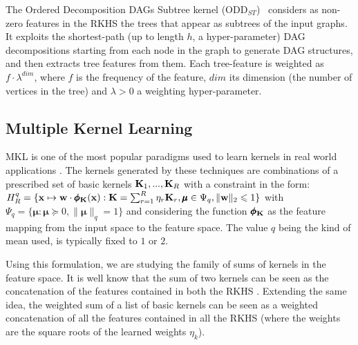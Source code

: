 \documentclass{esannV2}
\newcommand{\xx}{{\bf x}}
\newcommand{\KK}{{\bf K}}
\newcommand{\1}{{\bf 1}}
\newcommand{\mmu}{\pmb{\mu}}
\newcommand{\pphi}{\pmb{\phi}}
\begin{document}
The Ordered Decomposition DAGs Subtree kernel (ODD$_{ST}$)~\cite{DaSanMartino2016} considers as non-zero features in the RKHS the trees that appear as subtrees of the input graphs.
It exploits the shortest-path (up to length $h$, a hyper-parameter) DAG decompositions starting from each node in the graph to generate DAG structures, and then extracts tree features from them.
Each tree-feature is weighted as $f \cdot \lambda^{dim}$, where $f$ is the frequency of the feature, $dim$ its dimension (the number of vertices in the tree) and $\lambda>0$ a weighting hyper-parameter.

\subsection{Multiple Kernel Learning}
\label{MKL}
MKL \cite{Gonen2011} is one of the most popular paradigms used to learn kernels in real world applications \cite{Bucak2014,Castro2014}. %
The kernels generated by these techniques are combinations of a prescribed set of basic kernels $\KK_1,...,\KK_R$ with a constraint in the form:
$
	H_R^q = \{ \xx \mapsto \textbf{w} \cdot \pphi_\KK(\xx) : \KK = \sum_{r=1}^R \eta_r \KK_r, \mmu \in \Psi_q, \|\textbf{w}\|_2 \leqslant 1 \}
$
with $\Psi_q = \{ \mmu : \mmu \succcurlyeq 0, \| \mmu \|_q = 1 \}$ and considering the function $\pphi_\KK$ as the feature mapping from the input space to the feature space. The value $q$ being the kind of mean used, is typically fixed to $1$ or $2$.

Using this formulation, we are studying the family of sums of kernels in the feature space. It is well know that the sum of two kernels can be seen as the concatenation of the features contained in both the RKHS \cite{Shawe-Taylor2004}. Extending the same idea, the weighted sum of a list of basic kernels can be seen as a weighted concatenation of all the features contained in all the RKHS (where the weights are the square roots of the learned weights $\eta_k$).

\end{document}
